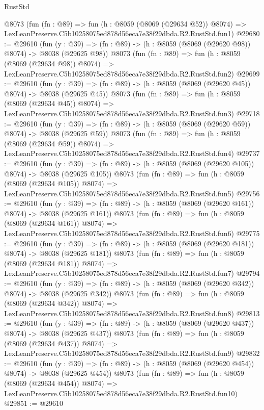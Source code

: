 \begin{lexlean}{RustStd}
\begin{coremodule}
    @8073
    (fun (fn : @89) =>
    fun (h : @8059 (@8069 (@29634 @52)) @8074) =>
    LexLeanPreserve.C5b10258075ed878d56eca7e38f29dbda.R2.RustStd.fun1)
@29680 := @29610
    (fun (y : @39) => (fn : @89) -> (h : @8059 (@8069 (@29620 @98)) @8074) -> @8038 (@29625 @98))
    @8073
    (fun (fn : @89) =>
    fun (h : @8059 (@8069 (@29634 @98)) @8074) =>
    LexLeanPreserve.C5b10258075ed878d56eca7e38f29dbda.R2.RustStd.fun2)
@29699 := @29610
    (fun (y : @39) => (fn : @89) -> (h : @8059 (@8069 (@29620 @45)) @8074) -> @8038 (@29625 @45))
    @8073
    (fun (fn : @89) =>
    fun (h : @8059 (@8069 (@29634 @45)) @8074) =>
    LexLeanPreserve.C5b10258075ed878d56eca7e38f29dbda.R2.RustStd.fun3)
@29718 := @29610
    (fun (y : @39) => (fn : @89) -> (h : @8059 (@8069 (@29620 @59)) @8074) -> @8038 (@29625 @59))
    @8073
    (fun (fn : @89) =>
    fun (h : @8059 (@8069 (@29634 @59)) @8074) =>
    LexLeanPreserve.C5b10258075ed878d56eca7e38f29dbda.R2.RustStd.fun4)
@29737 := @29610
    (fun (y : @39) => (fn : @89) -> (h : @8059 (@8069 (@29620 @105)) @8074) -> @8038 (@29625 @105))
    @8073
    (fun (fn : @89) =>
    fun (h : @8059 (@8069 (@29634 @105)) @8074) =>
    LexLeanPreserve.C5b10258075ed878d56eca7e38f29dbda.R2.RustStd.fun5)
@29756 := @29610
    (fun (y : @39) => (fn : @89) -> (h : @8059 (@8069 (@29620 @161)) @8074) -> @8038 (@29625 @161))
    @8073
    (fun (fn : @89) =>
    fun (h : @8059 (@8069 (@29634 @161)) @8074) =>
    LexLeanPreserve.C5b10258075ed878d56eca7e38f29dbda.R2.RustStd.fun6)
@29775 := @29610
    (fun (y : @39) => (fn : @89) -> (h : @8059 (@8069 (@29620 @181)) @8074) -> @8038 (@29625 @181))
    @8073
    (fun (fn : @89) =>
    fun (h : @8059 (@8069 (@29634 @181)) @8074) =>
    LexLeanPreserve.C5b10258075ed878d56eca7e38f29dbda.R2.RustStd.fun7)
@29794 := @29610
    (fun (y : @39) => (fn : @89) -> (h : @8059 (@8069 (@29620 @342)) @8074) -> @8038 (@29625 @342))
    @8073
    (fun (fn : @89) =>
    fun (h : @8059 (@8069 (@29634 @342)) @8074) =>
    LexLeanPreserve.C5b10258075ed878d56eca7e38f29dbda.R2.RustStd.fun8)
@29813 := @29610
    (fun (y : @39) => (fn : @89) -> (h : @8059 (@8069 (@29620 @437)) @8074) -> @8038 (@29625 @437))
    @8073
    (fun (fn : @89) =>
    fun (h : @8059 (@8069 (@29634 @437)) @8074) =>
    LexLeanPreserve.C5b10258075ed878d56eca7e38f29dbda.R2.RustStd.fun9)
@29832 := @29610
    (fun (y : @39) => (fn : @89) -> (h : @8059 (@8069 (@29620 @454)) @8074) -> @8038 (@29625 @454))
    @8073
    (fun (fn : @89) =>
    fun (h : @8059 (@8069 (@29634 @454)) @8074) =>
    LexLeanPreserve.C5b10258075ed878d56eca7e38f29dbda.R2.RustStd.fun10)
@29851 := @29610

\end{coremodule}
\end{lexlean}
